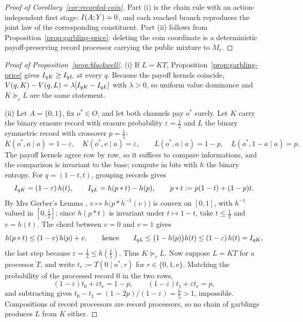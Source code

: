 \begin{proof}[Proof of Corollary~\ref{cor:recorded-coin}]
Part \textup{(i)} is the chain rule with an action-independent first stage:
$I(A;Y)=0$, and each reached branch reproduces the joint law of the
corresponding constituent.  Part \textup{(ii)} follows from
Proposition~\ref{prop:garbling-price}: deleting the coin coordinate is a
deterministic payoff-preserving record processor carrying the public mixture
to $M_t$.
\end{proof}

\begin{proof}[Proof of Proposition~\ref{prop:blackwell}]
(i) If $L=KT$, Proposition~\ref{prop:garbling-price} gives $I_{qK}\ge I_{qL}$ at every $q$.  Because the payoff
kernels coincide, $V(q,K)-V(q,L)=\lambda[I_{qK}-I_{qL}]$ with $\lambda>0$, so uniform value dominance and
$K\succeq_cL$ are the same statement.

(ii) Let $A=\{0,1\}$, fix $o^\ast\in O$, and let both channels pay $o^\ast$ surely.  Let $K$ carry the binary
erasure record with erasure probability $\varepsilon=\tfrac12$ and $L$ the binary symmetric record with crossover
$p=\tfrac15$:
\[
 K(o^\ast,a\mid a)=1-\varepsilon,\quad K(o^\ast,\mathrm e\mid a)=\varepsilon,
 \qquad
 L(o^\ast,a\mid a)=1-p,\quad L(o^\ast,1-a\mid a)=p.
\]
The payoff kernels agree row by row, so it suffices to compare informations, and the comparison is invariant to the
base; compute in bits with $h$ the binary entropy.  For $q=(1-t,t)$, grouping records gives
\[
 I_{qK}=(1-\varepsilon)\,h(t),
 \qquad
 I_{qL}=h(p\ast t)-h(p),
 \qquad p\ast t:=p(1-t)+(1-p)t.
\]
By Mrs Gerber's Lemma \cite{WynerZiv1973}, $v\mapsto h\bigl(p\ast h^{-1}(v)\bigr)$ is convex on $[0,1]$, with
$h^{-1}$ valued in $[0,\tfrac12]$; since $h(p\ast t)$ is invariant under $t\mapsto1-t$, take $t\le\tfrac12$ and
$v=h(t)$.  The chord between $v=0$ and $v=1$ gives
\[
 h(p\ast t)\le(1-v)\,h(p)+v,
 \qquad\text{hence}\qquad
 I_{qL}\le\bigl(1-h(p)\bigr)h(t)\le(1-\varepsilon)\,h(t)=I_{qK},
\]
the last step because $\varepsilon=\tfrac12\le h(\tfrac15)$.  Thus $K\succeq_cL$.  Now suppose $L=KT$ for a
processor $T$, and write $t_r:=T(0\mid o^\ast,r)$ for $r\in\{0,1,\mathrm e\}$.  Matching the probability of the
processed record $0$ in the two rows,
\[
 (1-\varepsilon)t_0+\varepsilon t_{\mathrm e}=1-p,
 \qquad
 (1-\varepsilon)t_1+\varepsilon t_{\mathrm e}=p,
\]
and subtracting gives $t_0-t_1=(1-2p)/(1-\varepsilon)=\tfrac65>1$, impossible.  Compositions of record processors
are record processors, so no chain of garblings produces $L$ from $K$ either.
\end{proof}

